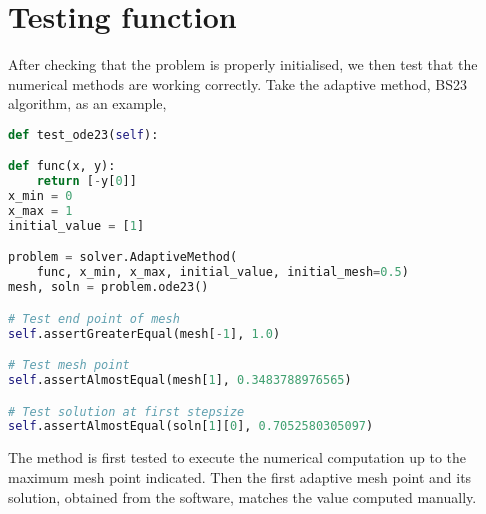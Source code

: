 \section{Testing function}
After checking that the problem is properly initialised, we then test that the numerical methods are working correctly. Take the adaptive method, BS23 algorithm, as an example, 
\begin{lstlisting}[language=Python]
def test_ode23(self):

def func(x, y):
    return [-y[0]]
x_min = 0
x_max = 1
initial_value = [1]

problem = solver.AdaptiveMethod(
    func, x_min, x_max, initial_value, initial_mesh=0.5)
mesh, soln = problem.ode23()

# Test end point of mesh
self.assertGreaterEqual(mesh[-1], 1.0)

# Test mesh point
self.assertAlmostEqual(mesh[1], 0.3483788976565)

# Test solution at first stepsize
self.assertAlmostEqual(soln[1][0], 0.7052580305097)
\end{lstlisting}
The method is first tested to execute the numerical computation up to the maximum mesh point indicated. Then the first adaptive mesh point and its solution, obtained from the software, matches the value computed manually. 